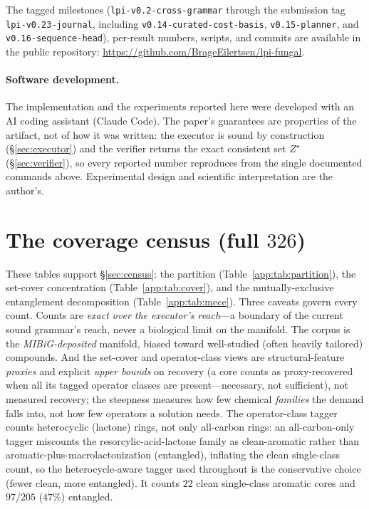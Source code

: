 \documentclass[11pt]{article}
\theoremstyle{definition}
\newcommand{\zstar}{\ensuremath{Z^{\star}}}
\begin{document}
The tagged
milestones (\texttt{lpi-v0.2-cross-grammar} through the submission tag \texttt{lpi-v0.23-journal}, including
\texttt{v0.14-curated-cost-basis}, \texttt{v0.15-planner}, and \texttt{v0.16-sequence-head}),
per-result numbers, scripts, and commits are available in the public
repository: \url{https://github.com/BrageEilertsen/lpi-fungal}.

\paragraph{Software development.} The implementation and the experiments reported here were developed
with an AI coding assistant (Claude Code). The paper's guarantees are properties of the artifact, not of
how it was written: the executor is sound by construction (\S\ref{sec:executor}) and the verifier returns
the exact consistent set $\zstar$ (\S\ref{sec:verifier}), so every reported number reproduces from the
single documented commands above. Experimental design and scientific interpretation are the author's.

\section{The coverage census (full $326$)}\label{app:census}
\small
These tables support \S\ref{sec:census}: the partition (Table~\ref{app:tab:partition}), the set-cover
concentration (Table~\ref{app:tab:cover}), and the mutually-exclusive entanglement decomposition
(Table~\ref{app:tab:mece}). Three caveats govern every count. Counts are \emph{exact over the executor's
reach}---a boundary of the current sound grammar's reach, never a biological limit on the manifold. The
corpus is the \emph{MIBiG-deposited} manifold, biased toward well-studied (often heavily tailored)
compounds. And the set-cover and operator-class views are structural-feature \emph{proxies} and explicit
\emph{upper bounds} on recovery (a core counts as proxy-recovered when all its tagged operator classes
are present---necessary, not sufficient), not measured recovery; the steepness measures how few chemical
\emph{families} the demand falls into, not how few operators a solution needs. The operator-class
tagger counts heterocyclic (lactone) rings, not only all-carbon rings: an all-carbon-only tagger
miscounts the resorcylic-acid-lactone family as clean-aromatic rather than
aromatic-plus-macrolactonization (entangled), inflating the clean single-class count, so the
heterocycle-aware tagger used throughout is the conservative choice (fewer clean, more entangled). It
counts $22$ clean single-class aromatic cores and $97/205$ ($47\%$) entangled.
\end{document}
